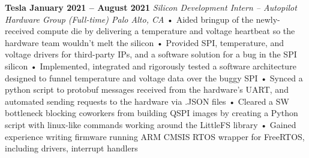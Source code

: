 \documentclass[../main.tex]{subfiles}
\begin{document}
%
\noindent\textbf{{\fontsize{\textFontSize}{\textFontBox}\selectfont Tesla \hfill January 2021 – August 2021}}
\vspace{1mm}\newline
%
%
{\fontsize{\textFontSize}{\textFontBox}\selectfont\emph{Silicon Development Intern – Autopilot Hardware Group (Full-time) \hfill Palo Alto, CA \hspace{0 cm}}}
\vspace{-0mm}\newline
%
%
{\fontsize{\textFontSize}{\textFontBox}\selectfont • \hspace{1mm} Aided bringup of the newly-received compute die by delivering a temperature and voltage heartbeat so the hardware team wouldn't melt the silicon }\newline
{\fontsize{\textFontSize}{\textFontBox}\selectfont • \hspace{1mm} Provided SPI, temperature, and voltage drivers for third-party IPs, and a software solution for a bug in the SPI silicon }\newline
{\fontsize{\textFontSize}{\textFontBox}\selectfont • \hspace{1mm} Implemented, integrated and rigorously tested a software architecture designed to funnel temperature and voltage data over the buggy SPI }\newline
{\fontsize{\textFontSize}{\textFontBox}\selectfont • \hspace{1mm} Synced a python script to protobuf messages received from the hardware's UART, and automated sending requests to the hardware via .JSON files }\newline
{\fontsize{\textFontSize}{\textFontBox}\selectfont • \hspace{1mm} Cleared a SW bottleneck blocking coworkers from building QSPI images by creating a Python script with linux-like commands working around the LittleFS library }\newline
{\fontsize{\textFontSize}{\textFontBox}\selectfont • \hspace{1mm} Gained experience writing firmware running ARM CMSIS RTOS wrapper for FreeRTOS, including drivers, interrupt handlers }
\vspace{-2mm}\newline
%
%
\end{document}

